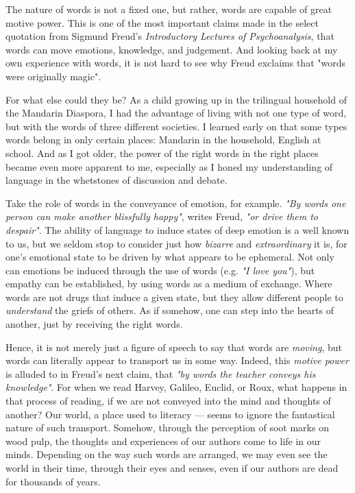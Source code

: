 The nature of words is not a fixed one, but rather, words are capable of great motive power. This is one of the most important claims made in the select quotation from Sigmund Freud's \emph{Introductory Lectures of Psychoanalysis}, that words can move emotions, knowledge, and judgement. And looking back at my own experience with words, it is not hard to see why Freud exclaims that "words were originally magic".

\noindent
For what else could they be? As a child growing up in the trilingual household of the Mandarin Diaspora, I had the advantage of living with not one type of word, but with the words of three different societies. I learned early on that some types words belong in only certain places: Mandarin in the household, English at school. And as I got older, the power of the right words in the right places became even more apparent to me, especially as I honed my understanding of language in the whetstones of discussion and debate.

Take the role of words in the conveyance of emotion, for example. \emph{"By words one person can make another blissfully happy"}, writes Freud, \emph{"or drive them to despair"}. The ability of language to induce states of deep emotion is a well known to us, but we seldom stop to consider just how \emph{bizarre} and \emph{extraordinary} it is, for one's emotional state to be driven by what appears to be ephemeral. Not only can emotions be induced through the use of words (e.g. \emph{"I love you"}), but empathy can be established, by using words as a medium of exchange. Where words are not drugs that induce a given state, but they allow different people to \emph{understand} the griefs of others. As if somehow, one can step into the hearts of another, just by receiving the right words.

Hence, it is not merely just a figure of speech to say that words are \emph{moving}, but words can literally appear to transport us in some way. Indeed, this \emph{motive power} is alluded to in Freud's next claim, that \emph{"by words the teacher \emph{conveys} his knowledge"}. For when we read Harvey, Galileo, Euclid, or Roux, what happens in that process of reading, if we are not conveyed into the mind and thoughts of another? Our world, a place used to literacy --- seems to ignore the fantastical nature of such transport. Somehow, through the perception of soot marks on wood pulp, the thoughts and experiences of our authors come to life in our minds. Depending on the way such words are arranged, we may even see the world in their time, through their eyes and senses, even if our authors are dead for thousands of years.

